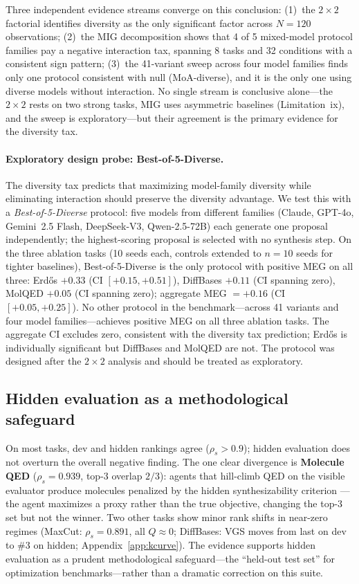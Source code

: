 \documentclass{article}
\begin{document}
Three independent evidence streams converge on this conclusion: (1)~the $2{\times}2$ factorial identifies diversity as the only significant factor across $N{=}120$ observations; (2)~the MIG decomposition shows that 4 of 5 mixed-model protocol families pay a negative interaction tax, spanning 8 tasks and 32 conditions with a consistent sign pattern; (3)~the 41-variant sweep across four model families finds only one protocol consistent with null (MoA-diverse), and it is the only one using diverse models without interaction. No single stream is conclusive alone---the $2{\times}2$ rests on two strong tasks, MIG uses asymmetric baselines (Limitation~ix), and the sweep is exploratory---but their agreement is the primary evidence for the diversity tax.

\paragraph{Exploratory design probe: Best-of-5-Diverse.}
The diversity tax predicts that maximizing model-family diversity while eliminating interaction should preserve the diversity advantage. We test this with a \emph{Best-of-5-Diverse} protocol: five models from different families (Claude, GPT-4o, Gemini~2.5 Flash, DeepSeek-V3, Qwen-2.5-72B) each generate one proposal independently; the highest-scoring proposal is selected with no synthesis step. On the three ablation tasks (10 seeds each, controls extended to $n{=}10$ seeds for tighter baselines), Best-of-5-Diverse is the only protocol with positive MEG on all three: Erd\H{o}s $+0.33$ (CI $[+0.15, +0.51]$), DiffBases $+0.11$ (CI spanning zero), MolQED $+0.05$ (CI spanning zero); aggregate MEG $= +0.16$ (CI $[+0.05, +0.25]$). No other protocol in the benchmark---across 41 variants and four model families---achieves positive MEG on all three ablation tasks. The aggregate CI excludes zero, consistent with the diversity tax prediction; Erd\H{o}s is individually significant but DiffBases and MolQED are not. The protocol was designed after the $2{\times}2$ analysis and should be treated as exploratory.

\subsection{Hidden evaluation as a methodological safeguard}
\label{sec:finding3}

On most tasks, dev and hidden rankings agree ($\rho_s{>}0.9$); hidden evaluation does not overturn the overall negative finding. The one clear divergence is \textbf{Molecule QED} ($\rho_s{=}0.939$, top-3 overlap $2/3$): agents that hill-climb QED on the visible evaluator produce molecules penalized by the hidden synthesizability criterion \citep{bickerton2012qed,ertl2009sascore}---the agent maximizes a proxy rather than the true objective, changing the top-3 set but not the winner. Two other tasks show minor rank shifts in near-zero regimes (MaxCut: $\rho_s{=}0.891$, all $Q{\approx}0$; DiffBases: VGS moves from last on dev to \#3 on hidden; Appendix~\ref{app:kcurve}). The evidence supports hidden evaluation as a prudent methodological safeguard---the ``held-out test set'' for optimization benchmarks---rather than a dramatic correction on this suite.
\end{document}
